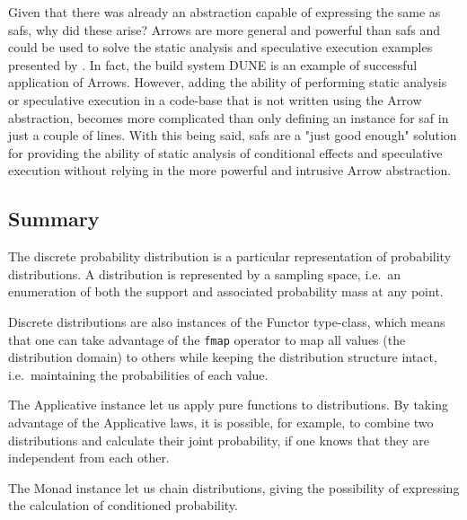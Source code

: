 \documentclass[
  oneside,
  11pt, a4paper,
  footinclude=true,
  headinclude=true,
  cleardoublepage=empty
]{scrbook}
\theoremstyle{definition}
\theoremstyle{definition}
\begin{document}
	Given that there was already an abstraction capable of expressing the same as \glspl{saf}, why did these arise? Arrows are more general and powerful than \glspl{saf} and could be used to solve the static analysis and speculative execution examples presented by \cite{andrey2019selective}. In fact, the build system DUNE \citep{dune_2018} is an example of successful application of Arrows. However, adding the ability of performing static analysis or speculative execution in a code-base that is not written using the Arrow abstraction, becomes more complicated than only defining an instance for \gls{saf} in just a couple of lines. With this being said, \glspl{saf} are a "just good enough" solution for providing the ability of static analysis of conditional effects and speculative execution without relying in the more powerful and intrusive Arrow abstraction.
    
    \subsection{Summary}\label{sec-summary}
    
    The discrete probability distribution is a particular representation of probability distributions. A distribution is represented by a sampling space, i.e.\ an enumeration of both the support and associated probability mass at any point.
    
    Discrete distributions are also instances of the Functor type-class, which means that one can take advantage of the \texttt{fmap} operator to map all values (the distribution domain) to others while keeping the distribution structure intact, i.e.\ maintaining the probabilities of each value.
        
    The Applicative instance let us apply pure functions to distributions. By taking advantage of the Applicative laws, it is possible, for example, to combine two distributions and calculate their joint probability, if one knows that they are independent from each other.
        
    The Monad instance let us chain distributions, giving the possibility of expressing the calculation of conditioned probability.
    
\end{document}
